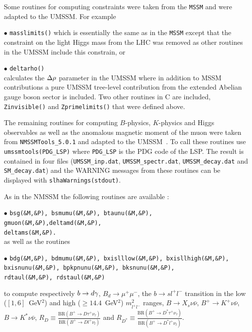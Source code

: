 \documentclass[12pt,a4paper]{article}
\begin{document}
Some routines for computing constraints were taken from the {\tt MSSM} and were adapted to the UMSSM. For example

 \noi$\bullet$ \verb|masslimits()|
which is essentially the same as in the {\tt MSSM} except that
the constraint on the light Higgs mass from the LHC was removed
as other routines in the UMSSM include this constrain, or

\noi$\bullet$ \verb|deltarho()|\\
 calculates  the $\Delta\rho$ parameter in the UMSSM where in addition to MSSM contributions
a pure UMSSM tree-level contribution from the extended Abelian gauge boson sector is included.
Two other routines in C are included, \verb|Zinvisible()| and \verb|Zprimelimits()| that were defined above. 


The remaining routines for computing $B$-physics, $K$-physics and Higgs observables as well as the anomalous magnetic moment of the muon
were taken from \verb|NMSSMTools_5.0.1| and adapted to the UMSSM~\cite{DaSilva:2013jga,Domingo:2015wyn}.
To call these routines use \verb|umssmtools(PDG_LSP)| where \verb|PDG_LSP| is the PDG code of the LSP. The result is contained in four files (\verb|UMSSM_inp.dat|,
\verb|UMSSM_spectr.dat|, \verb|UMSSM_decay.dat| and \verb|SM_decay.dat|) and the WARNING messages from these routines
can be displayed with \verb|slhaWarnings(stdout)|.

As in the NMSSM the following routines are available :

\noindent
$\bullet$ {\tt bsg(\&M,\&P), bsmumu(\&M,\&P), btaunu(\&M,\&P),  gmuon(\&M,\&P),deltamd(\&M,\&P),}\\
{\tt deltams(\&M,\&P).}\\ 

\noindent as well as the routines

\noindent
$\bullet$ {\tt bdg(\&M,\&P), bdmumu(\&M,\&P), bxislllow(\&M,\&P), bxisllhigh(\&M,\&P),}\\ 
{\tt bxisnunu(\&M,\&P), bpkpnunu(\&M,\&P), bksnunu(\&M,\&P),}\\ 
{\tt rdtaul(\&M,\&P), rdstaul(\&M,\&P)}

\noindent to compute respectively $b\rightarrow d\gamma$,  $B_d\to \mu^+\mu^-$, the $b \to s l^+l^-$ transition in the low ($[1,6]$~GeV$^2$) and high ($\geq14.4$~GeV$^2$) $m^2_{l^+l^-}$ ranges, $B \to X_s\nu\bar{\nu}$, $B^+ \to K^+\nu\bar{\nu}$, $B \to K^*\nu\bar{\nu}$, $R_D \equiv \frac{\textrm{BR}(B^+ \to D\tau^+\nu_{\tau})}{\textrm{BR}(B^+ \to Dl^+\nu_{l})}$ and 
$R_{D^*} \equiv \frac{\textrm{BR}(B^+ \to D^*\tau^+\nu_{\tau})}{\textrm{BR}(B^+ \to D^*l^+\nu_{l})}$.
\end{document}
